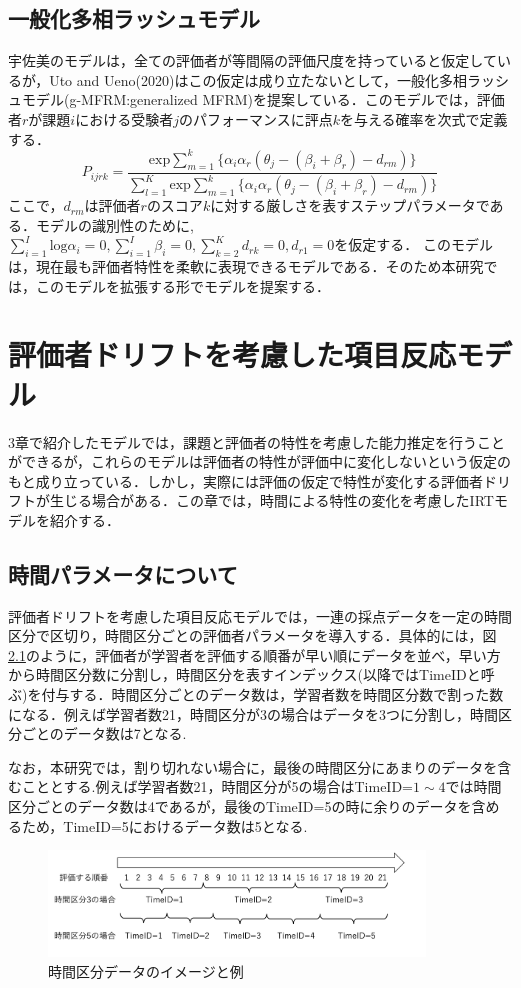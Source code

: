 \documentclass[a4paper,11pt,oneside,openany]{jsbook}
\begin{document}
\section{一般化多相ラッシュモデル}
宇佐美のモデルは，全ての評価者が等間隔の評価尺度を持っていると仮定しているが，Uto and Ueno(2020)はこの仮定は成り立たないとして，一般化多相ラッシュモデル(g-MFRM:generalized MFRM)を提案している\cite{g-MFRM}．このモデルでは，評価者$r$が課題$i$における受験者$j$のパフォーマンスに評点$k$を与える確率を次式で定義する．
\begin{displaymath}
  P_{ijrk}=\frac{\mathrm{exp}\sum_{m=1}^{k}\{\alpha_i\alpha_r(\theta_{j}-(\beta_{i}+\beta_{r})-d_{rm})\}}{\sum_{l=1}^{K}\mathrm{exp}\sum_{m=1}^{k}\{\alpha_i\alpha_r(\theta_{j}-(\beta_{i}+\beta_{r})-d_{rm})\}}
\end{displaymath}
ここで，$d_{rm}$は評価者$r$のスコア$k$に対する厳しさを表すステップパラメータである．モデルの識別性のために,$\sum^{I}_{i=1}{\mathrm{log}\alpha_i}=0,\sum^{I}_{i=1}{\beta_i}=0,\sum^{K}_{k=2}{d_{rk}}=0, d_{r1}=0$を仮定する．
このモデルは，現在最も評価者特性を柔軟に表現できるモデルである．そのため本研究では，このモデルを拡張する形でモデルを提案する．

\chapter{評価者ドリフトを考慮した項目反応モデル}
3章で紹介したモデルでは，課題と評価者の特性を考慮した能力推定を行うことができるが，これらのモデルは評価者の特性が評価中に変化しないという仮定のもと成り立っている．しかし，実際には評価の仮定で特性が変化する評価者ドリフトが生じる場合がある．この章では，時間による特性の変化を考慮したIRTモデルを紹介する．

\section{時間パラメータについて}
評価者ドリフトを考慮した項目反応モデルでは，一連の採点データを一定の時間区分で区切り，時間区分ごとの評価者パラメータを導入する．具体的には，図\ref{timeid}のように，評価者が学習者を評価する順番が早い順にデータを並べ，早い方から時間区分数に分割し，時間区分を表すインデックス(以降ではTimeIDと呼ぶ)を付与する．時間区分ごとのデータ数は，学習者数を時間区分数で割った数になる．例えば学習者数21，時間区分が3の場合はデータを3つに分割し，時間区分ごとのデータ数は7となる.

なお，本研究では，割り切れない場合に，最後の時間区分にあまりのデータを含むこととする.例えば学習者数21，時間区分が5の場合はTimeID=$1\sim4$では時間区分ごとのデータ数は4であるが，最後のTimeID=5の時に余りのデータを含めるため，TimeID=5におけるデータ数は5となる.
\begin{figure}[ht]
 \centering
\includegraphics[width=10cm]{img/timeid.png}
\caption{時間区分データのイメージと例}
 \label{timeid}
\end{figure}
\end{document}
